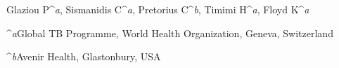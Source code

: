 Glaziou P^\textit{a}, Sismanidis C^\textit{a}, Pretorius C^\textit{b}, Timimi H^\textit{a}, Floyd K^\textit{a}

^\textit{a}Global TB Programme, World Health Organization, Geneva, Switzerland

^\textit{b}Avenir Health, Glastonbury, USA